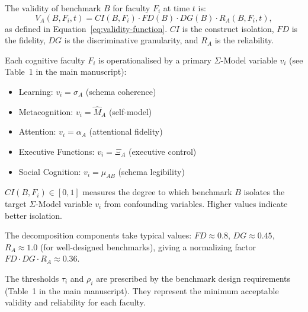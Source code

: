 
\begin{definition}
The validity of benchmark $B$ for faculty $F_i$ at time $t$ is:
\[
V_A(B, F_i, t) = CI(B, F_i) \cdot FD(B) \cdot DG(B) \cdot R_A(B, F_i, t),
\]
as defined in Equation~\eqref{eq:validity-function}. $CI$ is the
construct isolation, $FD$ is the fidelity, $DG$ is the discriminative
granularity, and $R_A$ is the reliability.
\end{definition}

\begin{definition}
Each cognitive faculty $F_i$ is operationalised by a primary
$\Sigma$-Model variable $v_i$ (see Table~1 in the main manuscript):
\begin{itemize}[nosep]
\item Learning: $v_i = \sigma_A$ (schema coherence)
\item Metacognition: $v_i = \hat{M}_A$ (self-model)
\item Attention: $v_i = \alpha_A$ (attentional fidelity)
\item Executive Functions: $v_i = \Xi_A$ (executive control)
\item Social Cognition: $v_i = \mu_{AB}$ (schema legibility)
\end{itemize}
\end{definition}

\begin{definition}
$CI(B, F_i) \in [0, 1]$ measures the degree to which benchmark $B$
isolates the target $\Sigma$-Model variable $v_i$ from confounding
variables. Higher values indicate better isolation.
\end{definition}

\begin{assumption}
The decomposition components take typical values:
$FD \approx 0.8$, $DG \approx 0.45$, $R_A \approx 1.0$ (for well-designed
benchmarks), giving a normalizing factor $FD \cdot DG \cdot R_A \approx 0.36$.
\end{assumption}

\begin{assumption}
The thresholds $\tau_i$ and $\rho_i$ are prescribed by the benchmark
design requirements (Table~1 in the main manuscript). They represent
the minimum acceptable validity and reliability for each faculty.
\end{assumption}


